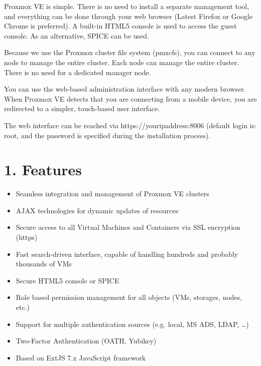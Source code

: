 Proxmox VE is simple. There is no need to install a separate management tool, and everything can be done through your web browser (Latest Firefox or Google Chrome is preferred). A built-in HTML5 console is used to access the guest console. As an alternative, SPICE can be used.

Because we use the Proxmox cluster file system (pmxcfs), you can connect to any node to manage the entire cluster. Each node can manage the entire cluster. There is no need for a dedicated manager node.

You can use the web-based administration interface with any modern browser. When Proxmox VE detects that you are connecting from a mobile device, you are redirected to a simpler, touch-based user interface.

The web interface can be reached via https://youripaddress:8006 (default login is: root, and the password is specified during the installation process).


\section{1. Features}

\begin{itemize}[leftmargin=2cm]

	\item Seamless integration and management of Proxmox VE clusters

	\item AJAX technologies for dynamic updates of resources

	\item Secure access to all Virtual Machines and Containers via SSL encryption (https)

	\item Fast search-driven interface, capable of handling hundreds and probably thousands of VMs

	\item Secure HTML5 console or SPICE

	\item Role based permission management for all objects (VMs, storages, nodes, etc.)

	\item Support for multiple authentication sources (e.g. local, MS ADS, LDAP, …)

	\item Two-Factor Authentication (OATH, Yubikey)

	\item Based on ExtJS 7.x JavaScript framework

\end{itemize}


